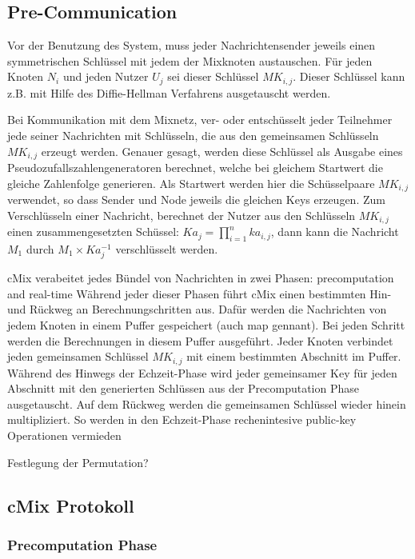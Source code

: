 \documentclass[
    fontsize=12pt,
    headings=small,
    parskip=half,           %
    bibliography=totoc,
    numbers=noenddot,       %
    open=any,               %
    ]{scrreprt}
\begin{document}
\subsection{Pre-Communication}


Vor der Benutzung des System, muss jeder Nachrichtensender jeweils einen symmetrischen Schlüssel mit jedem der Mixknoten austauschen.
Für jeden Knoten $N_i$ und jeden Nutzer $U_j$ sei dieser Schlüssel $MK_{i,j}$.
Dieser Schlüssel kann z.B. mit Hilfe des Diffie-Hellman Verfahrens ausgetauscht werden.

Bei Kommunikation mit dem Mixnetz, ver- oder entschüsselt jeder Teilnehmer jede seiner Nachrichten mit Schlüsseln, die aus den gemeinsamen Schlüsseln $MK_{i,j}$ erzeugt werden.
Genauer gesagt, werden diese Schlüssel als Ausgabe eines Pseudozufallszahlengeneratoren berechnet, welche bei gleichem Startwert die gleiche Zahlenfolge generieren.
Als Startwert werden hier die Schüsselpaare $MK_{i,j}$ verwendet, so dass Sender und Node jeweils die gleichen Keys erzeugen.
Zum Verschlüsseln einer Nachricht, berechnet der Nutzer aus den Schlüsseln $MK_{i,j}$
einen zusammengesetzten Schüssel: $Ka_j = \prod_{i=1}^{n} ka_{i,j}$,
dann kann die Nachricht $M_1$ durch $M_1 \times Ka_{j}^{-1}$ verschlüsselt werden.

cMix verabeitet jedes Bündel von Nachrichten in zwei Phasen:
precomputation and real-time
Während jeder dieser Phasen führt cMix einen bestimmten Hin- und Rückweg an Berechnungschritten aus.
Dafür werden die Nachrichten von jedem Knoten in einem Puffer gespeichert (auch map gennant).
Bei jeden Schritt werden die Berechnungen in diesem Puffer ausgeführt.
Jeder Knoten verbindet jeden gemeinsamen Schlüssel $MK_{i,j}$ mit einem bestimmten Abschnitt im Puffer.
Während des Hinwegs der Echzeit-Phase wird jeder gemeinsamer Key für jeden Abschnitt mit den generierten Schlüssen aus der Precomputation Phase ausgetauscht.
Auf dem Rückweg werden die gemeinsamen Schlüssel wieder hinein multipliziert.
So werden in den Echzeit-Phase rechenintesive public-key Operationen vermieden


Festlegung der Permutation?


\subsection{cMix Protokoll}
\subsubsection{Precomputation Phase}
\end{document}
